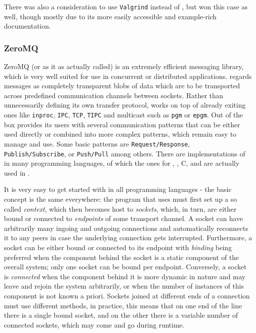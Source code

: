 There was also a consideration to use \texttt{Valgrind}\cite{Nethercote03valgrind:a} instead of \pin, but \pin
won this case as well, though mostly due to its more easily accessible and example-rich documentation. 
\subsubsection{ZeroMQ}
\label{sec:zmq}
{\small ZeroMQ}\cite{zmq} (or \zmq as it as actually called) is an extremely efficient messaging library, 
which is very well suited for use in concurrent or distributed applications. \zmq regards messages as 
completely transparent blobs of data which are to be transported across predefined communication channels 
between sockets. Rather than unnecessarily defining its own transfer protocol, \zmq works on top of already exiting 
ones like \texttt{inproc}, \texttt{IPC}, \texttt{TCP}, \texttt{TIPC} and multicast such as \texttt{pgm} or \texttt{epgm}.
Out of the box \zmq provides its users with several communication patterns that can be either used directly or combined 
into more complex patterns, which remain easy to manage and use. Some basic patterns are \texttt{Request/Response}, 
\texttt{Publish/Subscribe}, or \texttt{Push/Pull} among others.
There are implementations of \zmq in many programming languages, of which the ones for \java, \python, {\small C}, 
and \cpp are actually used in \xmlmate. 

It is very easy to get started with \zmq in all programming languages - the basic concept is the
same everywhere: the program that uses \zmq must first set up a so called \emph{context}, which then becomes
host to \emph{sockets}, which, in turn, are either bound or connected to \emph{endpoints} of some transport
channel. A socket can have arbitrarily many ingoing and outgoing connections and \zmq automatically reconnects
it to any peers in case the underlying connection gets interrupted. Furthermore, a socket can be either bound
or connected to its endpoint with \emph{binding} being preferred when the component behind the socket is a
static component of the overall system; only one socket can be bound per endpoint. Conversely, a socket is
\emph{connected} when the component behind it is more dynamic in nature and may leave and rejoin the system
arbitrarily, or when the number of instances of this component is not known a priori. Sockets joined at
different ends of a connection must use different methods, in practice, this means that on one end of the line
there is a single bound socket, and on the other there is a variable number of connected sockets, which may
come and go during runtime.

